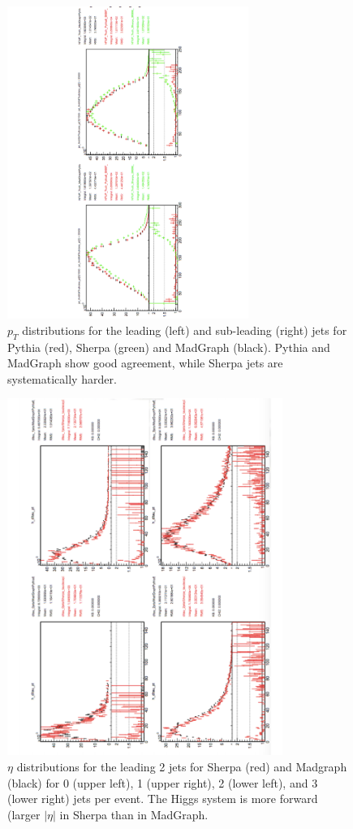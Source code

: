 \begin{figure}
  \center
  \includegraphics[width=0.7\textwidth, angle=270]{MonteCarlo/figures/gen_compare_pt.pdf}
  \caption{$p_T$ distributions for the leading (left) and sub-leading (right) jets for Pythia (red), Sherpa (green) and MadGraph (black).  
  Pythia and MadGraph show good agreement, while Sherpa jets are systematically harder.  \label{fig:gen_compare_pt}}
\end{figure}
\begin{figure}
  \center
  \includegraphics[width=0.8\textwidth, angle=270]{MonteCarlo/figures/di_tau_pt.pdf}
  \caption{$\eta$ distributions for the leading 2 jets for Sherpa (red) and Madgraph (black) for 0 (upper
  left), 1 (upper right), 2 (lower left), and 3 (lower right) jets per event. 
  The Higgs system is more forward (larger $|\eta|$ in Sherpa than in MadGraph.  \label{fig:di_tau_pt}}
\end{figure}



